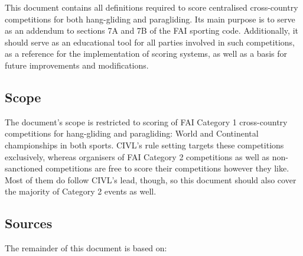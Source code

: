 \documentclass[gap.tex]{subfiles}
\begin{document}
This document contains all definitions required to score centralised
cross-country competitions for both hang-gliding and paragliding. Its main
purpose is to serve as an addendum to sections 7A and 7B of the FAI sporting
code. Additionally, it should serve as an educational tool for all parties
involved in such competitions, as a reference for the implementation of scoring
systems, as well as a basis for future improvements and modifications.

\subsection{Scope}
The document’s scope is restricted to scoring of FAI Category 1 cross-country
competitions for hang-gliding and paragliding: World and Continental
championships in both sports. CIVL’s rule setting targets these competitions
exclusively, whereas organisers of FAI Category 2 competitions as well as
non-sanctioned competitions are free to score their competitions however they
like. Most of them do follow CIVL’s lead, though, so this document should also
cover the majority of Category 2 events as well.

\subsection{Sources}
The remainder of this document is based on:
\end{document}
